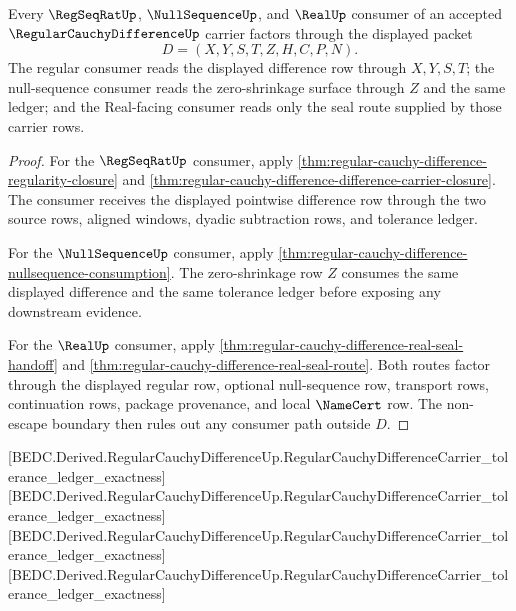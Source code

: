 \begin{theorem}
\label{thm:regular-cauchy-difference-consumer-exhaustion}
Every $\RegSeqRatUp$, $\NullSequenceUp$, and $\RealUp$ consumer of an accepted $\RegularCauchyDifferenceUp$ carrier factors through the displayed packet
$$
D=(X,Y,S,T,Z,H,C,P,N).
$$
The regular consumer reads the displayed difference row through $X,Y,S,T$; the null-sequence consumer reads the zero-shrinkage surface through $Z$ and the same ledger; and the Real-facing consumer reads only the seal route supplied by those carrier rows.
\end{theorem}
\begin{proof}
For the $\RegSeqRatUp$ consumer, apply \autoref{thm:regular-cauchy-difference-regularity-closure} and \autoref{thm:regular-cauchy-difference-difference-carrier-closure}. The consumer receives the displayed pointwise difference row through the two source rows, aligned windows, dyadic subtraction rows, and tolerance ledger.

For the $\NullSequenceUp$ consumer, apply \autoref{thm:regular-cauchy-difference-nullsequence-consumption}. The zero-shrinkage row $Z$ consumes the same displayed difference and the same tolerance ledger before exposing any downstream evidence.

For the $\RealUp$ consumer, apply \autoref{thm:regular-cauchy-difference-real-seal-handoff} and \autoref{thm:regular-cauchy-difference-real-seal-route}. Both routes factor through the displayed regular row, optional null-sequence row, transport rows, continuation rows, package provenance, and local $\NameCert$ row. The non-escape boundary then rules out any consumer path outside $D$.
\end{proof}

[BEDC.Derived.RegularCauchyDifferenceUp.RegularCauchyDifferenceCarrier\_tolerance\_ledger\_exactness]
[BEDC.Derived.RegularCauchyDifferenceUp.RegularCauchyDifferenceCarrier\_tolerance\_ledger\_exactness]
[BEDC.Derived.RegularCauchyDifferenceUp.RegularCauchyDifferenceCarrier\_tolerance\_ledger\_exactness]
[BEDC.Derived.RegularCauchyDifferenceUp.RegularCauchyDifferenceCarrier\_tolerance\_ledger\_exactness]

